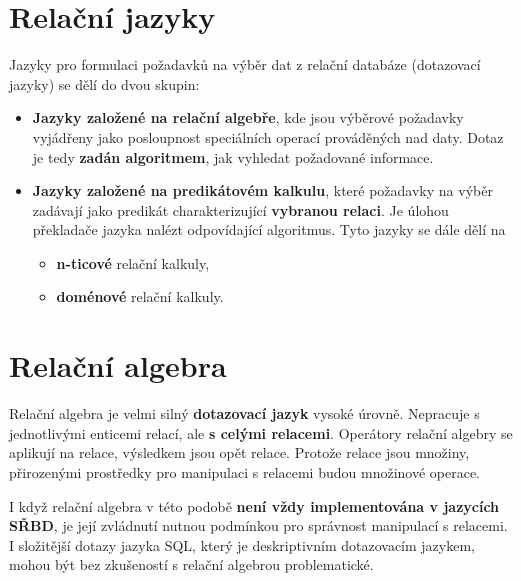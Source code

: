 \section{Relační jazyky}
Jazyky pro formulaci požadavků na výběr dat z relační databáze (dotazovací jazyky) se dělí do dvou skupin:
\begin{itemize}
    \item \textbf{Jazyky založené na  relační algebře}, kde jsou výběrové požadavky vyjádřeny jako posloupnost speciálních operací prováděných nad daty. Dotaz je tedy  \textbf{zadán algoritmem}, jak vyhledat požadované informace.
    \item \textbf{Jazyky založené na  predikátovém kalkulu}, které požadavky na výběr zadávají jako predikát charakterizující \textbf{vybranou relaci}. Je úlohou překladače jazyka nalézt odpovídající algoritmus. Tyto jazyky se dále dělí na
          \begin{itemize}
              \item \textbf{n-ticové} relační kalkuly,
              \item \textbf{doménové} relační kalkuly.
          \end{itemize}
\end{itemize}

\section{Relační algebra}
Relační algebra je velmi silný \textbf{dotazovací jazyk} vysoké úrovně. Nepracuje s jednotlivými enticemi relací, ale \textbf{s celými relacemi}. Operátory relační algebry se aplikují na relace, výsledkem jsou opět relace. Protože relace jsou množiny, přirozenými prostředky pro manipulaci s relacemi budou množinové operace.

I když relační algebra v této podobě \textbf{není vždy implementována v jazycích SŘBD}, je její zvládnutí nutnou podmínkou pro správnost manipulací s relacemi. I složitější dotazy jazyka SQL, který je deskriptivním dotazovacím jazykem, mohou být bez zkušeností s relační algebrou problematické.

